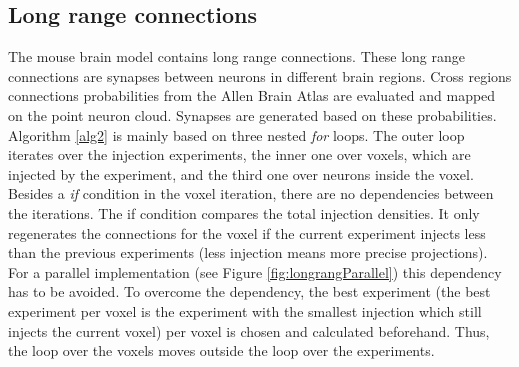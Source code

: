 

\subsection{Long range connections}
The mouse brain model contains long range connections.
These long range connections are synapses between neurons in different brain regions.
Cross regions connections probabilities from the Allen Brain Atlas are evaluated and 
mapped on the point neuron cloud. Synapses are generated based on these probabilities.
Algorithm \ref{alg2} is mainly based on three nested \emph{for} loops.
The outer loop iterates over the injection experiments, the inner one over voxels, which are injected by the experiment, and the third
one over neurons inside the voxel.
Besides a \emph{if} condition in the voxel iteration, there are no dependencies between the iterations.
The if condition compares the total injection densities.
It only regenerates the connections for the voxel if the current
experiment injects less than the previous experiments (less injection means more precise projections).
For a parallel implementation (see Figure \ref{fig:longrangParallel}) this dependency has to be avoided.
To overcome the dependency, the best experiment (the best experiment per voxel is the experiment with the smallest injection which still injects the current voxel) per voxel is chosen and calculated beforehand.
Thus, the loop over the voxels moves outside the loop over the experiments.

